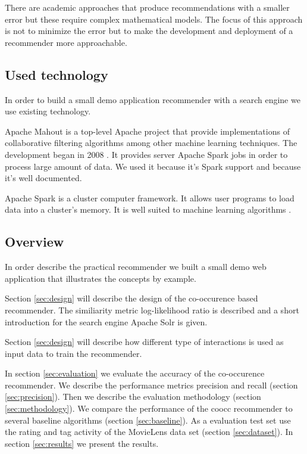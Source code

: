 There are academic approaches that produce recommendations with a smaller error but these require complex mathematical models. The focus of this approach is not to minimize the error but to make the development and deployment of a recommender more approachable.

\subsection{Used technology}
\label{sec:tech}

In order to build a small demo application recommender with a search engine we use existing technology.

Apache Mahout is a top-level Apache project that provide implementations of collaborative filtering algorithms among other machine learning techniques. The development began in 2008 \cite{Owen}. It provides server Apache Spark jobs in order to process large amount of data. We used it because it's Spark support and because it's well documented.

Apache Spark is a cluster computer framework. It allows user programs to load data into a cluster's memory. It is well suited to machine learning algorithms \cite{Karau}.

\subsection{Overview}

In order describe the practical recommender we built a small demo web application that illustrates the concepts by example.

Section \ref{sec:design} will describe the design of the co-occurence based recommender. The similiarity metric log-likelihood ratio is described and a short introduction for the search engine Apache Solr is given.

Section \ref{sec:design} will describe how different type of interactions is used as input data to train the recommender.

In section \ref{sec:evaluation} we evaluate the accuracy of the co-occurence recommender. We describe the performance metrics \gls{precision} and \gls{recall} (section \ref{sec:precision}). Then we describe the evaluation methodology (section \ref{sec:methodology}). We compare the performance of the \gls{coocc} recommender to several baseline algorithms (section \ref{sec:baseline}). As a evaluation test set use the rating and tag activity of the MovieLens data set (section \ref{sec:dataset}). In section \ref{sec:results} we present the results.